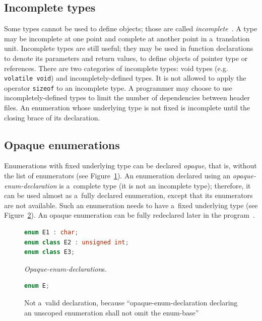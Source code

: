 \documentclass[nolot,nolof,nocover,printed]{fithesis3}
\newcommand{\stdN}[2]{\cite[#2]{#1}\xspace}
\begin{document}
\subsection{Incomplete types}
Some types cannot be used to define objects; those are called \textit{incomplete}~\stdN{n4296}{\S 3.1/5}. A type may be incomplete at one point and complete at another point in a~translation unit. Incomplete types are still useful; they may be used in function declarations to denote its parameters and return values, to define objects of pointer type or references. There are two categories of incomplete types: void types (e.g. \lstinline|volatile void|) and incompletely-defined types. It is not allowed to apply the operator \lstinline|sizeof| to an incomplete type. A programmer may choose to use incompletely-defined types to limit the number of dependencies between header files. An enumeration whose underlying type is not fixed is incomplete until the closing brace of its declaration.

\subsection{Opaque enumerations}

Enumerations with fixed underlying type can be declared \textit{opaque}, that is, without the list of enumerators (see Figure~\ref{fig:opaqueEnumDeclarations}). An enumeration declared using an \textit{opaque-enum-declaration} is a~complete type (it is not an incomplete type); therefore, it can be used almost as a~fully declared enumeration, except that its enumerators are not available. Such an enumeration needs to have a~fixed underlying type (see Figure~\ref{fig:opaqueEnumNotFixedUT}). An opaque enumeration can be fully redeclared later in the program~\stdN{n4296}{\S 7.2/3}.

\begin{figure}
\begin{lstlisting}[language=C++]
enum E1 : char;
enum class E2 : unsigned int;
enum class E3;
\end{lstlisting}
\caption{\textit{Opaque-enum-declaration}s.}
\label{fig:opaqueEnumDeclarations}
\end{figure}

\begin{figure}
\begin{lstlisting}[language=C++]
enum E;
\end{lstlisting}
\caption{Not a~valid declaration, because \enquote{opaque-enum-declaration declaring an unscoped enumeration shall not omit the enum-base}~\stdN{n4296}{\S 7.2/2}}
\label{fig:opaqueEnumNotFixedUT}
\end{figure}
\end{document}
